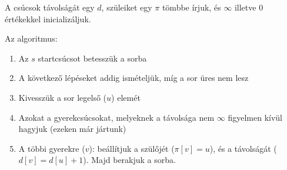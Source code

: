 \documentclass[margin=0px]{article}
\begin{document}
			A csúcsok távolságát egy $d$, szüleiket egy $\pi$ tömbbe írjuk, és $\infty$ illetve $0$ értékekkel inicializáljuk.
			
			Az algoritmus:
			\begin{enumerate}
				\item Az $s$ startcsúcsot betesszük a sorba
				\item A következő lépéseket addig ismételjük, míg a sor üres nem lesz
				\item Kivesszük a sor legelső ($u$) elemét
				\item Azokat a gyerekcsúcsokat, melyeknek a távolsága nem $\infty$ figyelmen kívül hagyjuk (ezeken már jártunk)
				\item A többi gyerekre ($v$): beállítjuk a szülőjét ($\pi[v] = u$), és a távolságát ($d[v] = d[u]+1$). Majd berakjuk a sorba.
			\end{enumerate}
\end{document}
